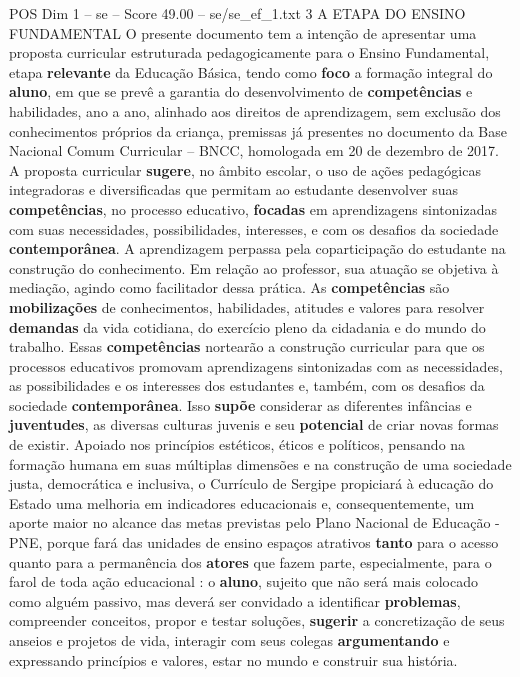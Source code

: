 \begin{textsample}{POS Dim 1 – se – Score 49.00 – se/se\_ef\_1.txt}  \label{ex:f1_pos_083}
3 A ETAPA DO ENSINO FUNDAMENTAL O presente documento tem a intenção de apresentar uma proposta curricular estruturada pedagogicamente para o Ensino Fundamental, etapa \textbf{relevante} da Educação Básica, tendo como \textbf{foco} a formação integral do \textbf{aluno}, em que se prevê a garantia do desenvolvimento de \textbf{competências} e habilidades, ano a ano, alinhado aos direitos de aprendizagem, sem exclusão dos conhecimentos próprios da criança, premissas já presentes no documento da Base Nacional Comum Curricular – BNCC, homologada em 20 de dezembro de 2017.
A proposta curricular \textbf{sugere}, no âmbito escolar, o uso de ações pedagógicas integradoras e diversificadas que permitam ao estudante desenvolver suas \textbf{competências}, no processo educativo, \textbf{focadas} em aprendizagens sintonizadas com suas necessidades, possibilidades, interesses, e com os desafios da sociedade \textbf{contemporânea}.
A aprendizagem perpassa pela coparticipação do estudante na construção do conhecimento.
Em relação ao professor, sua atuação se objetiva à mediação, agindo como facilitador dessa prática.
As \textbf{competências} são \textbf{mobilizações} de conhecimentos, habilidades, atitudes e valores para resolver \textbf{demandas} da vida cotidiana, do exercício pleno da cidadania e do mundo do trabalho.
Essas \textbf{competências} nortearão a construção curricular para que os processos educativos promovam aprendizagens sintonizadas com as necessidades, as possibilidades e os interesses dos estudantes e, também, com os desafios da sociedade \textbf{contemporânea}.
Isso \textbf{supõe} considerar as diferentes infâncias e \textbf{juventudes}, as diversas culturas juvenis e seu \textbf{potencial} de criar novas formas de existir.
Apoiado nos princípios estéticos, éticos e políticos, pensando na formação humana em suas múltiplas dimensões e na construção de uma sociedade justa, democrática e inclusiva, o Currículo de Sergipe propiciará à educação do Estado uma melhoria em indicadores educacionais e, consequentemente, um aporte maior no alcance das metas previstas pelo Plano Nacional de Educação - PNE, porque fará das unidades de ensino espaços atrativos \textbf{tanto} para o acesso quanto para a permanência dos \textbf{atores} que fazem parte, especialmente, para o farol de toda ação educacional : o \textbf{aluno}, sujeito que não será mais colocado como alguém passivo, mas deverá ser convidado a identificar \textbf{problemas}, compreender conceitos, propor e testar soluções, \textbf{sugerir} a concretização de seus anseios e projetos de vida, interagir com seus colegas \textbf{argumentando} e expressando princípios e valores, estar no mundo e construir sua história.

\end{textsample}
